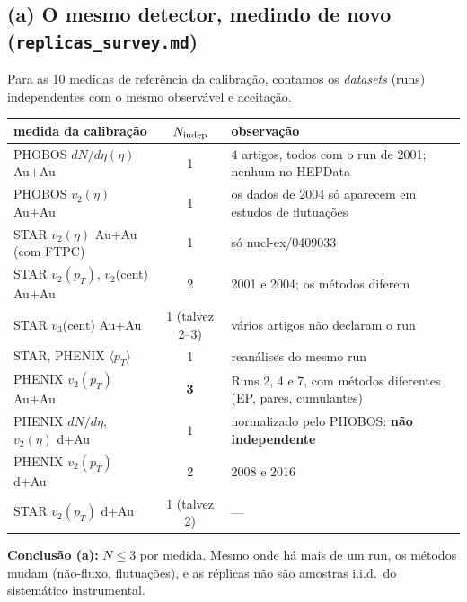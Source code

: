 \documentclass[11pt,a4paper]{article}
\newcommand{\arq}[1]{\texttt{\nolinkurl{#1}}}
\begin{document}
\subsection{\texorpdfstring{(a) O mesmo detector, medindo de novo (\arq{replicas_survey.md})}{(a) O mesmo detector, medindo de novo}}
Para as 10 medidas de referência da calibração, contamos os \emph{datasets} (runs) independentes com o mesmo observável e aceitação.
\begin{center}\small
\begin{tabularx}{\linewidth}{@{}Y c l@{}}
\toprule
medida da calibração & $N_{\rm indep}$ & observação \\
\midrule
PHOBOS $dN/d\eta(\eta)$ Au+Au & 1 & 4 artigos, todos com o run de 2001; nenhum no HEPData \\
PHOBOS $v_2(\eta)$ Au+Au & 1 & os dados de 2004 só aparecem em estudos de flutuações \\
STAR $v_2(\eta)$ Au+Au (com FTPC) & 1 & só nucl-ex/0409033 \\
STAR $v_2(p_T)$, $v_2$(cent) Au+Au & 2 & 2001 e 2004; os métodos diferem \\
STAR $v_3$(cent) Au+Au & 1 (talvez 2--3) & vários artigos não declaram o run \\
STAR, PHENIX $\langle p_T\rangle$ & 1 & reanálises do mesmo run \\
PHENIX $v_2(p_T)$ Au+Au & \textbf{3} & Runs 2, 4 e 7, com métodos diferentes (EP, pares, cumulantes) \\
PHENIX $dN/d\eta$, $v_2(\eta)$ d+Au & 1 & normalizado pelo PHOBOS: \textbf{não independente} \\
PHENIX $v_2(p_T)$ d+Au & 2 & 2008 e 2016 \\
STAR $v_2(p_T)$ d+Au & 1 (talvez 2) & --- \\
\bottomrule
\end{tabularx}
\end{center}
\textbf{Conclusão (a):} $N\le3$ por medida. Mesmo onde há mais de um run, os métodos mudam (não-fluxo, flutuações), e as réplicas
não são amostras i.i.d.\ do sistemático instrumental.
\end{document}
